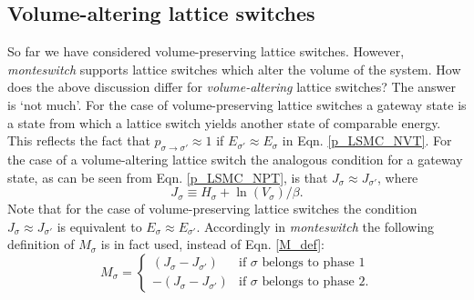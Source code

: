 \documentclass{report}
\begin{document}
\subsection{Volume-altering lattice switches}
So far we have considered volume-preserving lattice switches. However, \emph{monteswitch} supports lattice switches which alter the volume of the system.
How does the above discussion differ for \emph{volume-altering} lattice switches? The answer is `not much'. For the
case of volume-preserving lattice switches a gateway state is a state from which a lattice switch yields another state of comparable energy.
This reflects the fact that $p_{\sigma\to\sigma'}\approx 1$ if $E_{\sigma'}\approx E_{\sigma}$ in Eqn. \eqref{p_LSMC_NVT}. For the case of a
volume-altering lattice switch the analogous condition for a gateway state, as can be seen from Eqn. \eqref{p_LSMC_NPT}, is that
$J_{\sigma}\approx J_{\sigma'}$, where
\begin{equation}
J_{\sigma}\equiv H_{\sigma}+\ln(V_{\sigma})/\beta.
\end{equation}
Note that for the case of volume-preserving lattice switches the condition $J_{\sigma}\approx J_{\sigma'}$ is equivalent to $E_{\sigma}\approx E_{\sigma'}$.
Accordingly in \emph{monteswitch} the following definition of $M_{\sigma}$ is in fact used, instead of Eqn. \eqref{M_def}:
\begin{equation}
M_{\sigma}=
\begin{cases}
(J_{\sigma}-J_{\sigma'}) & \text{if $\sigma$ belongs to phase 1} \\
-(J_{\sigma}-J_{\sigma'}) & \text{if $\sigma$ belongs to phase 2}.
\end{cases}
\end{equation}
\end{document}
